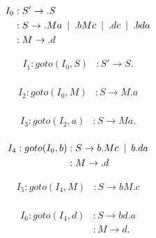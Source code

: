 \documentclass{article}
\newcommand\tab[1][5pt]{\hspace*{#1}}
\begin{document}
\begin{multicols}{2}
\begin{equation*}
\begin{aligned}
I_0 &: S' \rightarrow .S  \\
&: S \rightarrow .Ma \hspace{5pt} | \tab .bMc \tab | \tab .dc \tab | \tab .bda \\
&: M \rightarrow .d
\end{aligned}
\end{equation*}

\begin{equation*}
\begin{aligned}
I_1 : goto(I_0,S) &: S' \rightarrow S.  \\
\end{aligned}
\end{equation*}


\begin{equation*}
\begin{aligned}
I_2 : goto(I_0,M) &: S \rightarrow M.a  \\
\end{aligned}
\end{equation*}


\begin{equation*}
\begin{aligned}
I_3 : goto(I_2,a) &: S \rightarrow Ma.  \\
\end{aligned}
\end{equation*}


\begin{equation*}
\begin{aligned}
I_4 : goto(I_0,b) &: S \rightarrow b.Mc \tab | \tab b.da  \\
&: M \rightarrow .d \\
\end{aligned}
\end{equation*}


\begin{equation*}
\begin{aligned}
I_5 : goto(I_4,M) &: S \rightarrow bM.c  \\
\end{aligned}
\end{equation*}


\begin{equation*}
\begin{aligned}
I_6 : goto(I_4,d) &: S \rightarrow bd.a  \\
&: M \rightarrow d.  \\
\end{aligned}
\end{equation*}


\end{multicols}
\end{document}
